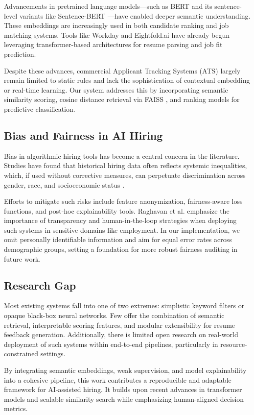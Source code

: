 \documentclass[a4paper]{article}
\begin{document}
\begin{multicols}{2}
Advancements in pretrained language models—such as BERT \cite{2} and its sentence-level variants like Sentence-BERT \cite{3}—have enabled deeper semantic understanding. These embeddings are increasingly used in both candidate ranking and job matching systems. Tools like Workday and Eightfold.ai have already begun leveraging transformer-based architectures for resume parsing and job fit prediction.

Despite these advances, commercial Applicant Tracking Systems (ATS) largely remain limited to static rules and lack the sophistication of contextual embedding or real-time learning. Our system addresses this by incorporating semantic similarity scoring, cosine distance retrieval via FAISS \cite{6}, and ranking models for predictive classification.

\subsection{Bias and Fairness in AI Hiring}
Bias in algorithmic hiring tools has become a central concern in the literature. Studies have found that historical hiring data often reflects systemic inequalities, which, if used without corrective measures, can perpetuate discrimination across gender, race, and socioeconomic status \cite{5}.

Efforts to mitigate such risks include feature anonymization, fairness-aware loss functions, and post-hoc explainability tools. Raghavan et al. \cite{5} emphasize the importance of transparency and human-in-the-loop strategies when deploying such systems in sensitive domains like employment. In our implementation, we omit personally identifiable information and aim for equal error rates across demographic groups, setting a foundation for more robust fairness auditing in future work.

\subsection{Research Gap}
Most existing systems fall into one of two extremes: simplistic keyword filters or opaque black-box neural networks. Few offer the combination of semantic retrieval, interpretable scoring features, and modular extensibility for resume feedback generation. Additionally, there is limited open research on real-world deployment of such systems within end-to-end pipelines, particularly in resource-constrained settings.

By integrating semantic embeddings, weak supervision, and model explainability into a cohesive pipeline, this work contributes a reproducible and adaptable framework for AI-assisted hiring. It builds upon recent advances in transformer models and scalable similarity search while emphasizing human-aligned decision metrics.




\end{multicols}
\end{document}
